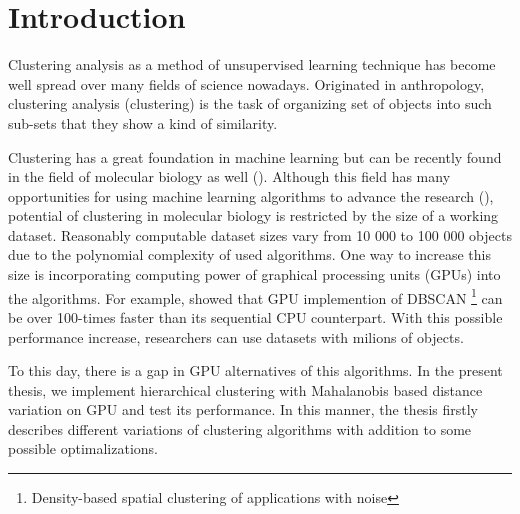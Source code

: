 \chapter*{Introduction}


Clustering analysis as a method of unsupervised learning technique has become well spread over many fields of science nowadays. Originated in anthropology, clustering analysis (clustering) is the task of organizing set of objects into such sub-sets that they show a kind of similarity. 

Clustering has a great foundation in machine learning but can be recently found in the field of molecular biology as well (\cite{Nugent2010}). Although this field has many opportunities for using machine learning algorithms to advance the research (\cite{btaa091}), potential of clustering in molecular biology is restricted by the size of a working dataset. Reasonably computable dataset sizes vary from 10 000 to 100 000 objects due to the polynomial complexity of used algorithms. One way to increase this size is incorporating computing power of graphical processing units (GPUs) into the algorithms. For example, \cite{andrade2013g} showed that GPU implemention of DBSCAN \footnote{Density-based spatial clustering of applications with noise} can be over 100-times faster than its sequential CPU counterpart. With this possible performance increase, researchers can use datasets with milions of objects. 

To this day, there is a gap in GPU alternatives of this algorithms. In the present thesis, we implement hierarchical clustering with Mahalanobis based distance variation on GPU and test its performance. In this manner, the thesis firstly describes different variations of clustering algorithms with addition to some possible optimalizations.